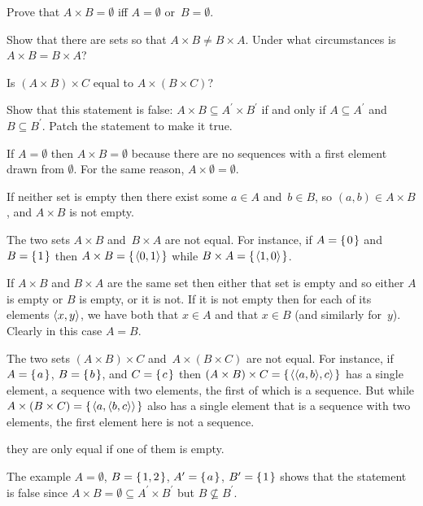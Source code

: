 \documentclass{ibl}  %
\begin{document}
\begin{ex}
\begin{exes}
\item Prove that $A\times B=\emptyset$ iff $A=\emptyset$ or~$B=\emptyset$.
\item Show that there are sets so that $A\times B\neq B\times A$.
  Under what circumstances is $A\times B=B\times A$?
\item Is $(A\times B)\times C$ equal to $A\times (B\times C)$?
\item Show that this statement is false: 
  $A\times B\subseteq A^\prime\times B^\prime$ if and only if
  $A\subseteq A^\prime$ and $B\subseteq B^\prime$.
  Patch the statement to make it true.
\end{exes}
\begin{ans}
\begin{exes}
\item If $A=\emptyset$ then $A\times B=\emptyset$ because there are no 
  sequences with a first element drawn from $\emptyset$.
  For the same reason, $A\times\emptyset=\emptyset$.
 
  If neither set is empty then there exist some $a\in A$ and~$b\in B$, so 
  $(a,b)\in A\times B$, and $A\times B$ is not empty.
\item The two sets $A\times B$ and~$B\times A$ are not equal. 
  For instance, if $A=\mbox{$\{\hspace{0.1em}0\hspace{0.1em}\}$}$ and~$B=\mbox{$\{\hspace{0.1em}1\hspace{0.1em}\}$}$ then 
  $A\times B=\mbox{$\{\hspace{0.1em}\langle0,1\rangle\hspace{0.1em}\}$}$
  while
  $B\times A=\mbox{$\{\hspace{0.1em}\langle1,0\rangle\hspace{0.1em}\}$}$.

  If $A\times B$ and $B\times A$ are the same set then either that set is empty 
  and so either $A$ is empty or $B$ is empty,
  or it is not.
  If it is not empty then for each of its elements $\langle x,y\rangle$,
  we have both that $x\in A$ and that $x\in B$ (and similarly for~$y$).
  Clearly in this case $A=B$.
\item The two sets $(A\times B)\times C$ and~$A\times (B\times C)$ 
  are not equal.
  For instance, if $A=\mbox{$\{\hspace{0.1em}a\hspace{0.1em}\}$}$, $B=\mbox{$\{\hspace{0.1em}b\hspace{0.1em}\}$}$, and $C=\mbox{$\{\hspace{0.1em}c\hspace{0.1em}\}$}$ then 
  $(A\times B)\times C=\mbox{$\{\hspace{0.1em}\langle\langle a,b\rangle,c\rangle\hspace{0.1em}\}$}$
  has a single element, a sequence with two elements, the first
  of which is a sequence.
  But while $A\times(B\times C)=\mbox{$\{\hspace{0.1em}\langle a,\langle b,c\rangle\rangle\hspace{0.1em}\}$}$ 
  also has a single element that is a sequence with two elements, 
  the first element here is not a sequence. 

  \remark they are only equal if one of them is empty.
\item The example 
  $A=\emptyset$, $B=\mbox{$\{\hspace{0.1em}1,2\hspace{0.1em}\}$}$, $A^\prime=\mbox{$\{\hspace{0.1em}a\hspace{0.1em}\}$}$, $B^\prime=\mbox{$\{\hspace{0.1em}1\hspace{0.1em}\}$}$
  shows that the statement is false since 
  $A\times B=\emptyset\subseteq A^\prime\times B^\prime$ but 
  $B\not\subseteq B^\prime$.


\end{exes}
\end{ans}
\end{ex}
\end{document}
